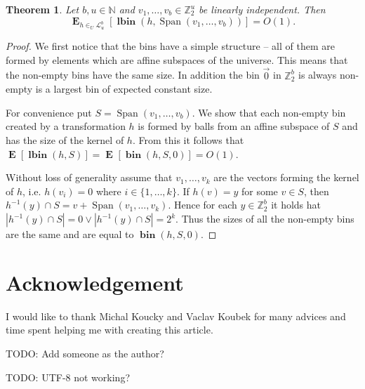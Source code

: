 \documentclass{article}
\newcommand{\bin}[3]{\operatorname{\mathbf{bin}}({#1}, {#2}, {#3})}
\newcommand{\lbin}[2]{\operatorname{\mathbf{lbin}}({#1}, {#2})}
\newcommand{\vecspace}[2]{\mathbb{Z}_{#1}^{#2}}
\newcommand{\binvecspace}[1]{\vecspace{2}{#1}}
\newcommand{\linearmaps}[2]{\mathcal{L}_{#1}^{#2}}
\newcommand{\expects}[2]{\operatorname{\mathbf{E}}_{{#1}}\left[{#2}\right]}
\newcommand{\expect}[1]{\expects{}{#1}}
\newtheorem{theorem}{Theorem}
\begin{document}
\begin{theorem}
Let $b, u \in \mathbb{N}$ and $v_1, \dots, v_b \in \mathbb{Z}_2^u$ be linearly independent. Then \[ \expects{h \in_U \linearmaps{u}{b}}{\lbin{h}{\operatorname{Span}(v_1, \dots, v_b)}} = O(1) .\]
\end{theorem}
\begin{proof}
We first notice that the bins have a simple structure -- all of them are formed by elements which are affine subspaces of the universe.
This means that the non-empty bins have the same size.
In addition the bin $\vec{0}$ in $\binvecspace{b}$ is always non-empty is a largest bin of expected constant size.

For convenience put $S = \operatorname{Span}(v_1, \dots, v_b)$. 
We show that each non-empty bin created by a transformation $h$ is formed by balls from an affine subspace of $S$ and has the size of the kernel of $h$.
From this it follows that $\expect{\lbin{h}{S}} = \expect{\bin{h}{S}{0}} = O(1)$.

Without loss of generality assume that $v_1, \dots, v_k$ are the vectors forming the kernel of $h$, i.e. $h(v_i) = 0$ where $i \in \{1, \dots, k\}$.
If $h(v) = y$ for some $v \in S$, then $h^{-1}(y) \cap S = v + \operatorname{Span}(v_1, \dots, v_k)$.
Hence for each $y \in \mathbb{Z}_2^b$ it holds hat $|h^{-1}(y) \cap S| = 0 \vee |h^{-1}(y) \cap S| = 2^k$.
Thus the sizes of all the non-empty bins are the same and are equal to $\bin{h}{S}{0}$.
\end{proof}

\section{Acknowledgement}

I would like to thank Michal Koucky and Vaclav Koubek for many advices and  time spent helping me with creating this article.

TODO: Add someone as the author?

TODO: UTF-8 not working?
\end{document}
